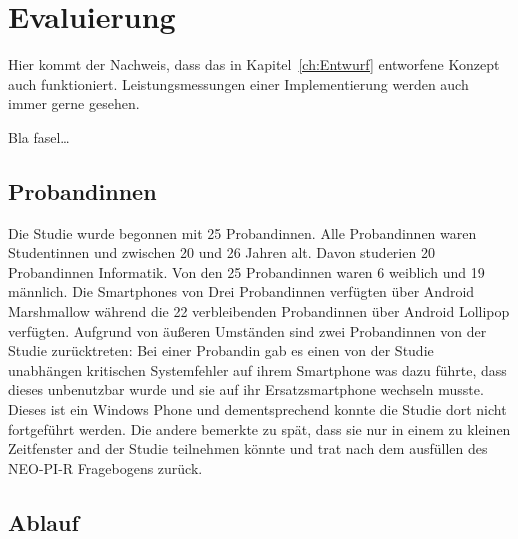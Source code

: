 
\chapter{Evaluierung}
\label{ch:Evaluierung}
Hier kommt der Nachweis, dass das in Kapitel~\ref{ch:Entwurf}
entworfene Konzept auch funktioniert. Leistungsmessungen einer
Implementierung werden auch immer gerne gesehen.

Bla fasel\ldots

\section{Probandinnen}
\label{ch:Evaluierung:sec:Abschnitt1}

Die Studie wurde begonnen mit 25 Probandinnen.
Alle Probandinnen waren Studentinnen und zwischen 20 und 26 Jahren alt.
Davon studerien 20 Probandinnen Informatik. 
Von den 25 Probandinnen waren 6 weiblich und 19 männlich.
Die Smartphones von Drei Probandinnen verfügten über Android Marshmallow während die 22 verbleibenden Probandinnen über Android Lollipop verfügten.  
Aufgrund von äußeren Umständen sind zwei Probandinnen von der Studie zurücktreten:
Bei einer Probandin gab es einen von der Studie unabhängen kritischen Systemfehler auf ihrem Smartphone was dazu führte, dass dieses unbenutzbar wurde und sie auf ihr Ersatzsmartphone wechseln musste.
Dieses ist ein Windows Phone und dementsprechend konnte die Studie dort nicht fortgeführt werden.
Die andere bemerkte zu spät, dass sie nur in einem zu kleinen Zeitfenster and der Studie teilnehmen könnte und trat nach dem ausfüllen des NEO-PI-R Fragebogens zurück.


\section{Ablauf}
\label{ch:Entwurf:sec:Abschnitt2}

